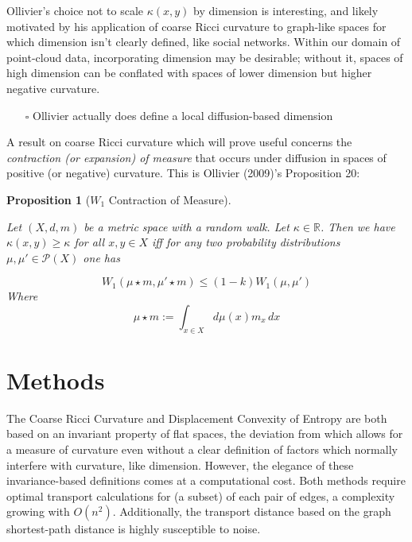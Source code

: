 \documentclass[
  letterpaper,
  DIV=11,
  numbers=noendperiod]{scrartcl}
\providecommand{\tightlist}{%
  \setlength{\itemsep}{0pt}\setlength{\parskip}{0pt}}\usepackage{longtable,booktabs,array}
\theoremstyle{plain}
\theoremstyle{plain}
\newtheorem{proposition}{Proposition}[section]
\theoremstyle{definition}
\theoremstyle{plain}
\theoremstyle{definition}
\theoremstyle{remark}
\begin{document}
Ollivier's choice not to scale \(\kappa(x,y)\) by dimension is
interesting, and likely motivated by his application of coarse Ricci
curvature to graph-like spaces for which dimension isn't clearly
defined, like social networks. Within our domain of point-cloud data,
incorporating dimension may be desirable; without it, spaces of high
dimension can be conflated with spaces of lower dimension but higher
negative curvature.

\begin{itemize}
\tightlist
\item[$\square$]
  Ollivier actually does define a local diffusion-based dimension
\end{itemize}

A result on coarse Ricci curvature which will prove useful concerns the
\emph{contraction (or expansion) of measure} that occurs under diffusion
in spaces of positive (or negative) curvature. This is Ollivier (2009)'s
Proposition 20:

\begin{proposition}[\(W_1\) Contraction of
Measure]\protect\hypertarget{prp-ollivier-contraction-of-measure}{}\label{prp-ollivier-contraction-of-measure}

Let \((X,d,m)\) be a metric space with a random walk. Let
\(\kappa \in \mathbb{R}\). Then we have \(\kappa(x,y) \geq \kappa\) for
all \(x,y \in X\) iff for any two probability distributions
\(\mu, \mu' \in \mathcal{P}(X)\) one has

\[
W_{1}(\mu \star m, \mu' \star m) \leq (1-k)W_{1}(\mu, \mu')
\] Where \[
 \mu \star m := \int_{{x \in X}} d\mu(x)m_{x} \, dx
\]

\end{proposition}

\section{Methods}\label{methods}

The Coarse Ricci Curvature and Displacement Convexity of Entropy are
both based on an invariant property of flat spaces, the deviation from
which allows for a measure of curvature even without a clear definition
of factors which normally interfere with curvature, like dimension.
However, the elegance of these invariance-based definitions comes at a
computational cost. Both methods require optimal transport calculations
for (a subset) of each pair of edges, a complexity growing with
\(O(n^2)\). Additionally, the transport distance based on the graph
shortest-path distance is highly susceptible to noise.
\end{document}
